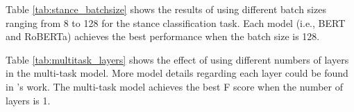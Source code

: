 \documentclass[11pt]{article}
\begin{document}
Table \ref{tab:stance_batchsize} shows the results of using different batch sizes ranging from 8 to 128 for the stance classification task. Each model (i.e., BERT and RoBERTa) achieves the best performance when the batch size is 128. 



\begin{table}[H]
	\centering
{}
\caption{Results of different batch sizes for stance classification task.}
	\label{tab:stance_batchsize}
\end{table}



Table \ref{tab:multitask_layers} shows the effect of using different numbers of layers in the multi-task model. More model details regarding each layer could be found in \cite{cheng2021argument}'s work. The multi-task model achieves the best F score when the number of layers is 1.


\begin{table}[H]
	\centering
{}
\caption{Effect of different numbers of layers used in the multi-task model.}
	\label{tab:multitask_layers}
\end{table}
\end{document}
